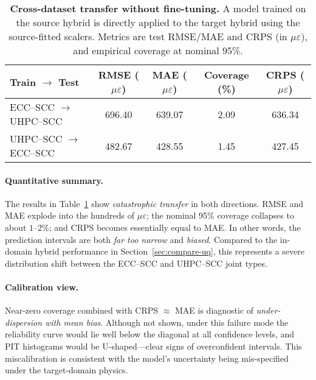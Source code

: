 \documentclass{article}
\begin{document}
\begin{table}[h!]
\centering
\caption{\textbf{Cross-dataset transfer without fine-tuning.} A model trained on the source hybrid is directly applied to the target hybrid using the source-fitted scalers. Metrics are test RMSE/MAE and CRPS (in $\mu\varepsilon$), and empirical coverage at nominal 95\%.}
\label{tab:cross_transfer}
\begin{tabular}{lcccc}
\toprule
\textbf{Train $\rightarrow$ Test} & \textbf{RMSE} ($\mu\varepsilon$) & \textbf{MAE} ($\mu\varepsilon$) & \textbf{Coverage} (\%) & \textbf{CRPS} ($\mu\varepsilon$) \\
\midrule
ECC–SCC $\rightarrow$ UHPC–SCC & 696.40 & 639.07 & 2.09 & 636.34 \\
UHPC–SCC $\rightarrow$ ECC–SCC & 482.67 & 428.55 & 1.45 & 427.45 \\
\bottomrule
\end{tabular}
\end{table}

\paragraph{Quantitative summary.} The results in Table~\ref{tab:cross_transfer} show \emph{catastrophic transfer} in both directions. RMSE and MAE explode into the hundreds of $\mu\varepsilon$; the nominal 95\% coverage collapses to about $1$–$2\%$; and CRPS becomes essentially equal to MAE. In other words, the prediction intervals are both \emph{far too narrow} and \emph{biased}. Compared to the in-domain hybrid performance in Section~\ref{sec:compare-uq}, this represents a severe distribution shift between the ECC–SCC and UHPC–SCC joint types.

\paragraph{Calibration view.} Near-zero coverage combined with CRPS $\approx$ MAE is diagnostic of \emph{under-dispersion with mean bias}. Although not shown, under this failure mode the reliability curve would lie well below the diagonal at all confidence levels, and PIT histograms would be U-shaped—clear signs of overconfident intervals. This miscalibration is consistent with the model’s uncertainty being mis-specified under the target-domain physics.
\end{document}
